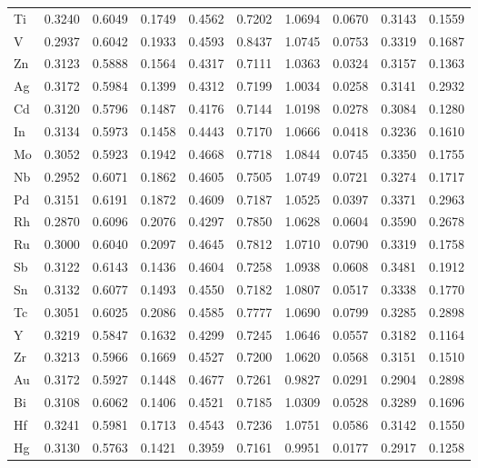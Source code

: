 \documentclass[a4paper, 12pt]{article}
\begin{document}
\begin{table}[htbp]
{\begin{tabular}{l *{9}{l}}
      Ti & 0.3240 & 0.6049 & 0.1749 & 0.4562 & 0.7202 & 1.0694 & 0.0670 & 0.3143 & 0.1559 \\
      V  & 0.2937 & 0.6042 & 0.1933 & 0.4593 & 0.8437 & 1.0745 & 0.0753 & 0.3319 & 0.1687 \\
      Zn & 0.3123 & 0.5888 & 0.1564 & 0.4317 & 0.7111 & 1.0363 & 0.0324 & 0.3157 & 0.1363 \\
      Ag & 0.3172 & 0.5984 & 0.1399 & 0.4312 & 0.7199 & 1.0034 & 0.0258 & 0.3141 & 0.2932 \\
      Cd & 0.3120 & 0.5796 & 0.1487 & 0.4176 & 0.7144 & 1.0198 & 0.0278 & 0.3084 & 0.1280 \\
      In & 0.3134 & 0.5973 & 0.1458 & 0.4443 & 0.7170 & 1.0666 & 0.0418 & 0.3236 & 0.1610 \\
      Mo & 0.3052 & 0.5923 & 0.1942 & 0.4668 & 0.7718 & 1.0844 & 0.0745 & 0.3350 & 0.1755 \\
      Nb & 0.2952 & 0.6071 & 0.1862 & 0.4605 & 0.7505 & 1.0749 & 0.0721 & 0.3274 & 0.1717 \\
      Pd & 0.3151 & 0.6191 & 0.1872 & 0.4609 & 0.7187 & 1.0525 & 0.0397 & 0.3371 & 0.2963 \\
      Rh & 0.2870 & 0.6096 & 0.2076 & 0.4297 & 0.7850 & 1.0628 & 0.0604 & 0.3590 & 0.2678 \\
      Ru & 0.3000 & 0.6040 & 0.2097 & 0.4645 & 0.7812 & 1.0710 & 0.0790 & 0.3319 & 0.1758 \\
      Sb & 0.3122 & 0.6143 & 0.1436 & 0.4604 & 0.7258 & 1.0938 & 0.0608 & 0.3481 & 0.1912 \\
      Sn & 0.3132 & 0.6077 & 0.1493 & 0.4550 & 0.7182 & 1.0807 & 0.0517 & 0.3338 & 0.1770 \\
      Tc & 0.3051 & 0.6025 & 0.2086 & 0.4585 & 0.7777 & 1.0690 & 0.0799 & 0.3285 & 0.2898 \\
      Y  & 0.3219 & 0.5847 & 0.1632 & 0.4299 & 0.7245 & 1.0646 & 0.0557 & 0.3182 & 0.1164 \\
      Zr & 0.3213 & 0.5966 & 0.1669 & 0.4527 & 0.7200 & 1.0620 & 0.0568 & 0.3151 & 0.1510 \\
      Au & 0.3172 & 0.5927 & 0.1448 & 0.4677 & 0.7261 & 0.9827 & 0.0291 & 0.2904 & 0.2898 \\
      Bi & 0.3108 & 0.6062 & 0.1406 & 0.4521 & 0.7185 & 1.0309 & 0.0528 & 0.3289 & 0.1696 \\
      Hf & 0.3241 & 0.5981 & 0.1713 & 0.4543 & 0.7236 & 1.0751 & 0.0586 & 0.3142 & 0.1550 \\
      Hg & 0.3130 & 0.5763 & 0.1421 & 0.3959 & 0.7161 & 0.9951 & 0.0177 & 0.2917 & 0.1258 \\

\end{tabular}}
\end{table}
\end{document}
